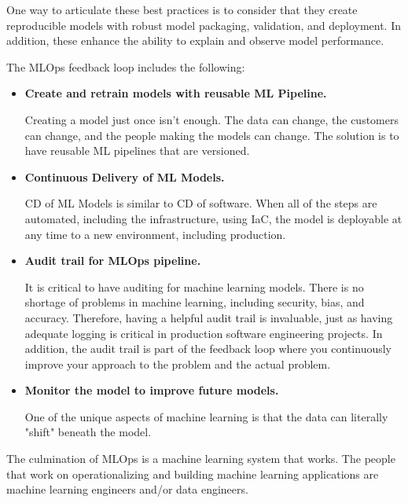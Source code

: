 \begin{enumerate}
    One way to articulate these best practices is to consider that
    they create reproducible models with robust model packaging,
    validation, and deployment. In addition, these enhance the
    ability to explain and observe model performance.

    The MLOps feedback loop includes the following:
    \begin{itemize}
        \item \textbf{Create and retrain models with reusable ML
        Pipeline.}
        
        \noindent
        Creating a model just once isn't enough. The data can
        change, the customers can change, and the people making
        the models can change. The solution is to have reusable
        ML pipelines that are versioned.
        

        \item \textbf{Continuous Delivery of ML Models.}
        
        \noindent
        CD of ML Models is similar to CD of software. When all of
        the steps are automated, including the infrastructure,
        using IaC, the model is deployable at any time to a new
        environment, including production.


        \item \textbf{Audit trail for MLOps pipeline.}
        
        \noindent
        It is critical to have auditing for machine learning models.
        There is no shortage of problems in machine learning,
        including security, bias, and accuracy. Therefore,
        having a helpful audit trail is invaluable, just as having
        adequate logging is critical in production software engineering
        projects. In addition, the audit trail is part of the
        feedback loop where you continuously improve your approach
        to the problem and the actual problem.
        

        \item \textbf{Monitor the model to improve future models.}
        
        \noindent
        One of the unique aspects of machine learning is that the
        data can literally "shift" beneath the model.

    \end{itemize}



\end{enumerate}
The culmination of MLOps is a machine learning system that works.
The people that work on operationalizing and building machine
learning applications are machine learning engineers and/or data
engineers.



